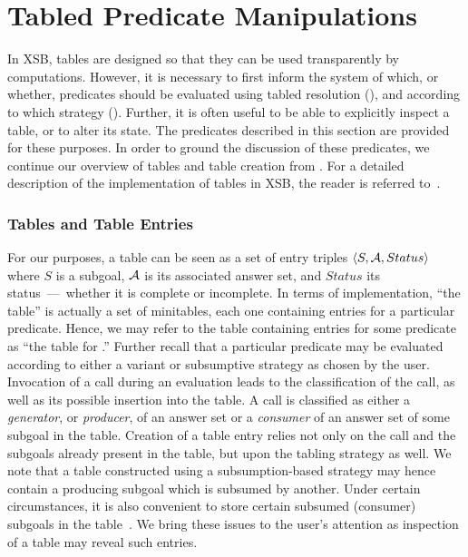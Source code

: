 
\newcommand{\retn}{\code{ret/n}}


\section{Tabled Predicate Manipulations} \label{sec:TablingPredicates}

In XSB, tables are designed so that they can be used transparently by
computations.  However, it is necessary to first inform the system of
which, or whether, predicates should be evaluated using tabled
resolution (), and according to which
strategy ().  Further,
it is often useful to be able to explicitly inspect a table, or to
alter its state.  The predicates described in this section are
provided for these purposes.  In order to ground the discussion of
these predicates, we continue our overview of tables and table
creation from .  For a detailed
description of the implementation of tables in XSB, the reader is
referred to~\cite{RRSSW98,TST99,CuSW99b}.


\subsubsection*{Tables and Table Entries}

For our purposes, a table can be seen as a set of entry triples $\langle
S,{\cal A},Status \rangle$ where $S$ is a subgoal, ${\cal A}$ is its associated
answer set, and $Status$ its status~---~whether it is complete or
incomplete.  In terms of implementation, ``the table'' is actually a
set of minitables, each one containing entries for a particular
predicate.  Hence, we may refer to the table containing entries for
some predicate  as ``the table for .''  Further
recall that a particular predicate may be evaluated according to
either a variant or subsumptive strategy as chosen by the user.
Invocation of a call during an evaluation leads to the classification
of the call, as well as its possible insertion into the table.  A call
is classified as either a \emph{generator}, or \emph{producer}, of an
answer set or a \emph{consumer} of an answer set of some subgoal in
the table.  Creation of a table entry relies not only on the call and
the subgoals already present in the table, but upon the tabling
strategy as well.  We note that a table constructed using a
subsumption-based strategy may hence contain a producing subgoal which
is subsumed by another.  Under certain circumstances, it is also
convenient to store certain subsumed (consumer) subgoals in the
table~\cite{TST99}.  We bring these issues to the user's attention as
inspection of a table may reveal such entries.

